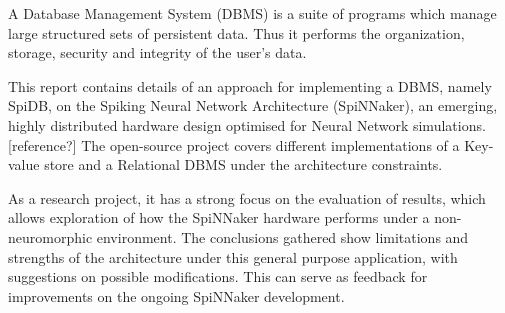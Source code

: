 A Database Management System (DBMS) is a suite of programs which manage large structured sets of persistent data.\cite{dbmsdef} Thus it performs the organization, storage, security and integrity of the user's data.

This report contains details of an approach for implementing a DBMS, namely SpiDB, on the Spiking Neural Network Architecture (SpiNNaker), an emerging, highly distributed hardware design optimised for Neural Network simulations.[reference?] The open-source project covers different implementations of a Key-value store and a Relational DBMS under the architecture constraints.

As a research project, it has a strong focus on the evaluation of results, which allows exploration of how the SpiNNaker hardware performs under a non-neuromorphic environment. The conclusions gathered show limitations and strengths of the architecture under this general purpose application, with suggestions on possible modifications. This can serve as feedback for improvements on the ongoing SpiNNaker development.